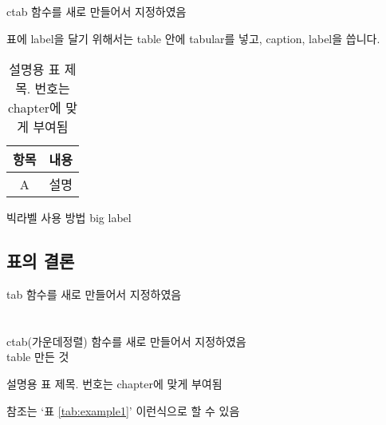 ctab 함수를 새로 만들어서 지정하였음 \\


표에 label을 달기 위해서는 table 안에 tabular를 넣고, caption, label을 씁니다.
\begin{table}[htbp] %
  \centering %
  \begin{tabular}{|c|c|}
    \hline
    항목 & 내용 \\
    \hline
    A & 설명 \\
    \hline
  \end{tabular}
  \caption{설명용 표 제목. 번호는 chapter에 맞게 부여됨}
  \label{tab:example} %
\end{table}

 빅라벨 사용 방법 big label

\newpage
\subsection{표의 결론}

tab 함수를 새로 만들어서 지정하였음 \\
\\\\
ctab(가운데정렬) 함수를 새로 만들어서 지정하였음 \\
table 만든 것 \\
\begin{table}[htbp] %
  \caption{설명용 표 제목. 번호는 chapter에 맞게 부여됨}
  \label{tab:example1} %
\end{table}

참조는 `표 \ref{tab:example1}' 이런식으로 할 수 있음